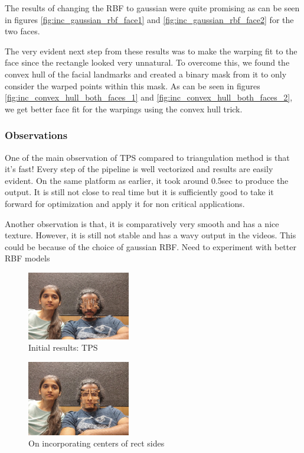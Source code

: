 \documentclass[conference]{IEEEtran}
\begin{document}
The results of changing the RBF to gaussian were quite promising as can be seen in figures \ref{fig:inc_gaussian_rbf_face1} and \ref{fig:inc_gaussian_rbf_face2} for the two faces.

The very evident next step from these results was to make the warping fit to the face since the rectangle looked very unnatural. To overcome this, we found the convex hull of the facial landmarks and created a binary mask from it to only consider the warped points within this mask. As can be seen in figures \ref{fig:inc_convex_hull_both_faces_1} and \ref{fig:inc_convex_hull_both_faces_2}, we get better face fit for the warpings using the convex hull trick.

\subsubsection{Observations}
One of the main observation of TPS compared to triangulation method is that it's fast! Every step of the pipeline is well vectorized and results are easily evident. On the same platform as earlier, it took around $0.5$sec to produce the output. It is still not close to real time but it is sufficiently good to take it forward for optimization and apply it for non critical applications. 

Another observation is that, it is comparatively very smooth and has a nice texture. However, it is still not stable and has a wavy output in the videos. This could be because of the choice of gaussian RBF. Need to experiment with better RBF models 

\begin{figure}[!htbp]
\centering
\includegraphics[width=0.4\textwidth]{media/initial_result_tps.jpg}
\caption{Initial results: TPS}
\label{fig: initial_result_tps}
\end{figure}


\begin{figure}[!htbp]
\centering
\includegraphics[width=0.4\textwidth]{media/incorporate_rect_sides_centers.jpg}
\caption{On incorporating centers of rect sides}
\label{fig: inc_rect_sides_centers}
\end{figure}
\end{document}
